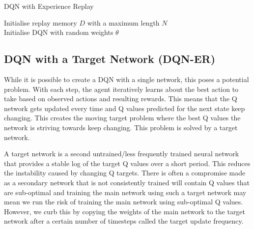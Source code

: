 \documentclass{article}
\begin{document}
\begin{algorithm}[H]
\caption{DQN with Experience Replay}
\SetAlgoLined
\DontPrintSemicolon
\small %
Initialise replay memory $D$ with a maximum length $N$\;\\
Initialise DQN with random weights $\theta$\; \\ 
\end{algorithm}

\subsection{DQN with a Target Network (DQN-ER)}
While it is possible to create a DQN with a single network, this poses a potential problem. With each step, the agent iteratively learns about the best action to take based on observed actions and resulting rewards. This means that the Q network gets updated every time and Q values predicted for the next state keep changing. This creates the moving target problem where the best Q values the network is striving towards keep changing. This problem is solved by a target network. 

A target network is a second untrained/less frequently trained neural network that provides a stable log of the target Q values over a short period. This reduces the instability caused by changing Q targets. There is often a compromise made as a secondary network that is not consistently trained will contain Q values that are sub-optimal and training the main network using such a target network may mean we run the risk of training the main network using sub-optimal Q values. However, we curb this by copying the weights of the main network to the target network after a certain number of timesteps called the target update frequency. 
\end{document}

